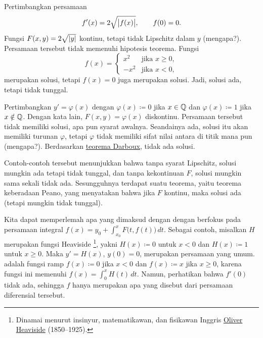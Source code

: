 \begin{example}
Pertimbangkan persamaan
\begin{equation*}
f'(x) = 2 \sqrt{\bigl\lvert {f(x)} \bigr\rvert}, \qquad f(0) = 0 .
\end{equation*}
Fungsi $F(x,y) = 2 \sqrt{\lvert {y} \rvert}$ kontinu,
tetapi tidak Lipschitz dalam $y$ (mengapa?).
Persamaan tersebut tidak memenuhi hipotesis teorema.
Fungsi
\begin{equation*}
f(x) =
\begin{cases}
x^2 & \text{jika } x \geq 0,\\
-x^2 & \text{jika } x < 0,
\end{cases}
\end{equation*}
merupakan solusi, tetapi $f(x) = 0$ juga merupakan solusi.
Jadi, solusi ada, tetapi tidak tunggal.
\end{example}

\begin{example}
Pertimbangkan $y' = \varphi(x)$ dengan $\varphi(x) \coloneqq 0$ jika $x \in {\mathbb{Q}}$ dan
$\varphi(x)\coloneqq 1$ jika $x
\notin {\mathbb{Q}}$.  Dengan kata lain, $F(x,y) = \varphi(x)$ diskontinu.
Persamaan tersebut tidak memiliki solusi, apa pun syarat
awalnya.
Seandainya ada, solusi itu akan memiliki
turunan $\varphi$, tetapi $\varphi$ tidak memiliki sifat nilai antara
di titik mana pun (mengapa?).  Berdasarkan
\hyperref[thm:darboux]{teorema Darboux}, tidak ada solusi.
\end{example}

Contoh-contoh tersebut menunjukkan bahwa tanpa syarat Lipschitz, solusi mungkin
ada tetapi tidak tunggal, dan tanpa kekontinuan $F$, solusi mungkin
sama sekali tidak ada.
Sesungguhnya terdapat suatu teorema, yaitu teorema keberadaan Peano, yang menyatakan bahwa jika $F$
kontinu, maka solusi ada (tetapi mungkin tidak tunggal).

\begin{remark}
Kita dapat memperlemah apa yang dimaksud dengan 
dengan berfokus pada persamaan integral
$f(x) = y_0 + \int_{x_0}^x F\bigl(t,f(t)\bigr) \, dt$.  Sebagai contoh,
misalkan $H$ merupakan
fungsi Heaviside%
\footnote{Dinamai menurut
insinyur, matematikawan, dan fisikawan Inggris
\href{https://en.wikipedia.org/wiki/Oliver_Heaviside}{Oliver Heaviside}
(1850--1925).},
yakni $H(x) \coloneqq 0$ untuk $x < 0$ dan $H(x) \coloneqq 1$ untuk $x \geq 0$.
Maka
$y' = H(x)$, $y(0) = 0$,
merupakan persamaan yang umum.
adalah fungsi ramp $f(x) \coloneqq 0$ jika $x < 0$ dan $f(x) \coloneqq x$ jika $x \geq 0$,
karena fungsi ini memenuhi
$f(x) = \int_0^x H(t)\, dt$.  Namun, perhatikan bahwa $f'(0)$ tidak ada,
sehingga $f$ hanya merupakan apa yang disebut \emph{} dari
persamaan diferensial tersebut.
\end{remark}


